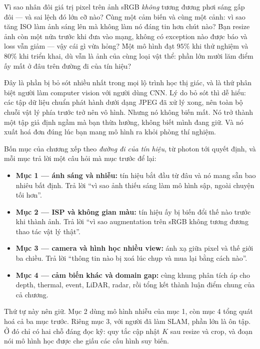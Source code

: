 \documentclass[../../deep_learning.tex]{subfiles}
\begin{document}
\begin{khoigoi}
\h{Vì sao nhân đôi giá trị pixel trên ảnh sRGB \emph{không} tương đương phơi sáng gấp đôi --- và sai lệch đó lớn cỡ nào?}
\h{Cùng một cảm biến và cùng một cảnh: vì sao tăng ISO làm ảnh sáng lên mà không làm nó đáng tin hơn chút nào?}
\h{Bạn resize ảnh còn một nửa trước khi đưa vào mạng, không có exception nào được báo và loss vẫn giảm --- vậy cái gì vừa hỏng?}
\h{Một mô hình đạt \(95\%\) khi thử nghiệm và \(80\%\) khi triển khai, dù vẫn là ảnh của cùng loại vật thể: phần lớn mười lăm điểm ấy mất ở đâu trên đường đi của tín hiệu?}
\end{khoigoi}

Đây là phần bị bỏ sót nhiều nhất trong mọi lộ trình học thị giác, và là thứ phân biệt người làm computer vision với người dùng CNN. Lý do bỏ sót thì dễ hiểu: các tập dữ liệu chuẩn phát hành dưới dạng JPEG đã xử lý xong, nên toàn bộ chuỗi vật lý phía trước trở nên vô hình. Nhưng nó không biến mất. Nó trở thành một tập giả định ngầm mà bạn thừa hưởng, không biết mình đang giữ. Và nó xuất hoá đơn đúng lúc bạn mang mô hình ra khỏi phòng thí nghiệm.

Bốn mục của chương xếp theo \emph{đường đi của tín hiệu}, từ photon tới quyết định, và mỗi mục trả lời một câu hỏi mà mục trước để lại:

\begin{itemize}
\item \textbf{Mục 1 --- ánh sáng và nhiễu:} tín hiệu bắt đầu từ đâu và nó mang sẵn bao nhiêu bất định. Trả lời ``vì sao ảnh thiếu sáng làm mô hình sập, ngoài chuyện tối hơn''.
\item \textbf{Mục 2 --- ISP và không gian màu:} tín hiệu ấy bị biến đổi thế nào trước khi thành ảnh. Trả lời ``vì sao augmentation trên sRGB không tương đương thao tác vật lý thật''.
\item \textbf{Mục 3 --- camera và hình học nhiều view:} ánh xạ giữa pixel và thế giới ba chiều. Trả lời ``thông tin nào bị xoá lúc chụp và mua lại bằng cách nào''.
\item \textbf{Mục 4 --- cảm biến khác và domain gap:} cùng khung phân tích áp cho depth, thermal, event, LiDAR, radar, rồi tổng kết thành luận điểm chung của cả chương.
\end{itemize}

Thứ tự này nên giữ. Mục 2 dùng mô hình nhiễu của mục 1, còn mục 4 tổng quát hoá cả ba mục trước. Riêng mục 3, với người đã làm SLAM, phần lớn là ôn tập. Ở đó chỉ có hai chỗ đáng đọc kỹ: quy tắc cập nhật \(K\) sau resize và crop, và đoạn nói mô hình học được che giấu các cấu hình suy biến.
\end{document}
